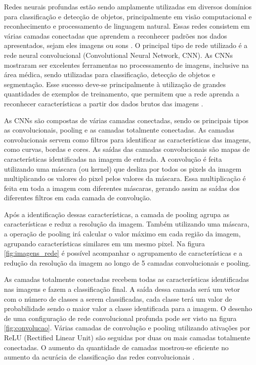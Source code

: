 \documentclass[conference]{IEEEtran}
\begin{document}

Redes neurais profundas estão sendo amplamente utilizadas em diversos domínios para classificação e detecção de objetos, principalmente em visão computacional e reconhecimento e processamento de linguagem natural. Essas redes consistem em várias camadas conectadas que aprendem a reconhecer padrões nos dados apresentados, sejam eles imagens ou sons \cite{LeCun2015}. O principal tipo de rede utilizado é a rede neural convolucional (Convolutional Neural Network, CNN). As CNNs mostraram ser excelentes ferramentas no processamento de imagens, inclusive na área médica, sendo utilizadas para classificação, detecção de objetos e segmentação. Esse sucesso deve-se principalmente à utilização de grandes quantidades de exemplos de treinamento, que permitem que a rede aprenda a reconhecer características a partir dos dados brutos das imagens \cite{greenspan2016}. %

As CNNs são compostas de várias camadas conectadas, sendo os principais tipos as convolucionais, pooling e as camadas totalmente conectadas. As camadas convolucionais servem como filtros para identificar as características das imagens, como curvas, bordas e cores. As saídas das camadas convolucionais são mapas de características identificadas na imagem de entrada. A convolução é feita utilizando uma máscara (ou kernel) que desliza por todos os pixels da imagem multiplicando os valores do pixel pelos valores da máscara. Essa multiplicação é feita em toda a imagem com diferentes máscaras, gerando assim as saídas dos diferentes filtros em cada camada de convolução.

Após a identificação dessas características, a camada de pooling agrupa as características e reduz a resolução da imagem. Também utilizando uma máscara, a operação de pooling irá calcular o valor máximo em cada região da imagem, agrupando características similares em um mesmo pixel. Na figura \ref{fig:imagens_rede} é possível acompanhar o agrupamento de características e a redução da resolução da imagem ao longo de 5 camadas convolucionais e pooling.

As camadas totalmente conectadas recebem todas as características identificadas nas imagens e fazem a classificação final. A saída dessa camada será um vetor com o número de classes a serem classificadas, cada classe terá um valor de probabilidade sendo o maior valor a classe identificada para a imagem. O desenho de uma configuração de rede convolucional profunda pode ser visto na figura \ref{fig:convolucao}. Várias camadas de convolução e pooling utilizando ativações por ReLU (Rectified Linear Unit) são seguidas por duas ou mais camadas totalmente conectadas. O aumento da quantidade de camadas mostrou-se eficiente no aumento da acurácia de classificação das redes convolucionais \cite{simonyan2014}.
\end{document}

